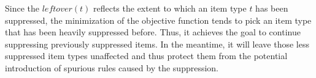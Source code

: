 Since the $leftover(t)$ reflects the extent to which an item type $t$ has been suppressed,
the minimization of the objective function tends to pick an item type that has been heavily suppressed before.
Thus, it achieves the goal to continue suppressing previously suppressed items.
In the meantime, it will leave those less suppressed item types
unaffected and thus protect them from
the potential introduction of spurious rules caused by the suppression.
%

%
%

